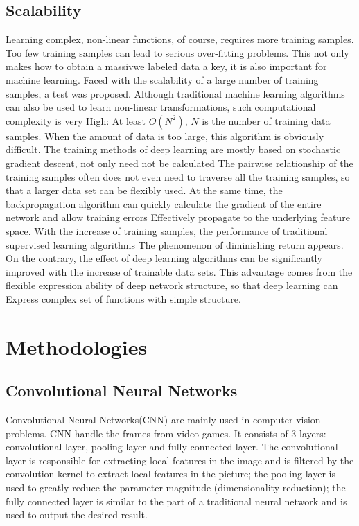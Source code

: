 \documentclass[11pt,en]{elegantpaper}
\begin{document}
\subsection{Scalability}
Learning complex, non-linear functions, of course, requires more training samples. Too few training samples can lead to serious over-fitting problems. This not only makes how to obtain a massivwe labeled data a key, it is also important for machine learning. Faced with the scalability of a large number of training samples, a test was proposed. Although traditional machine learning algorithms can also be used to learn non-linear transformations, such computational complexity is very High: At least $O(N^2)$, $N$ is the number of training data samples. When the amount of data is too large, this algorithm is obviously difficult. The training methods of deep learning are mostly based on stochastic gradient descent, not only need not be calculated The pairwise relationship of the training samples often does not even need to traverse all the training samples, so that a larger data set can be flexibly used. At the same time, the backpropagation algorithm can quickly calculate the gradient of the entire network and allow training errors Effectively propagate to the underlying feature space\cite{37}. With the increase of training samples, the performance of traditional supervised learning algorithms The phenomenon of diminishing return appears. On the contrary, the effect of deep learning algorithms can be significantly improved with the increase of trainable data sets. This advantage comes from the flexible expression ability of deep network structure, so that deep learning can Express complex set of functions with simple structure\cite{5}.

\section{Methodologies}
\subsection{Convolutional Neural Networks}
Convolutional Neural Networks(CNN) are mainly used in computer vision problems. CNN handle the frames from video games. It consists of 3 layers: convolutional layer, pooling layer and fully connected layer. The convolutional layer is responsible for extracting local features in the image and is filtered by the convolution kernel to extract local features in the picture; the pooling layer is used to greatly reduce the parameter magnitude (dimensionality reduction); the fully connected layer is similar to the part of a traditional neural network and is used to output the desired result.
\end{document}
